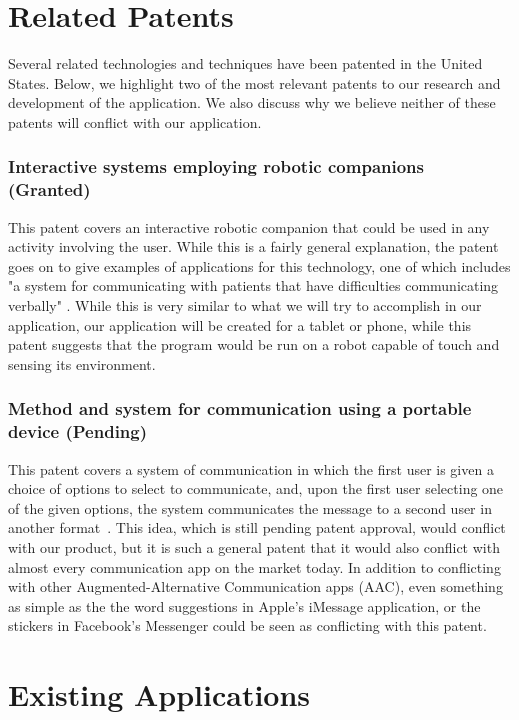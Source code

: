 \section{Related Patents}
Several related technologies and techniques have been patented in the United States. Below, we highlight two of the most relevant patents to our research and development of the application. We also discuss why we believe neither of these patents will conflict with our application.

\subsubsection{Interactive systems employing robotic companions (Granted)}
This patent covers an interactive robotic companion that could be used in any activity involving the user. While this is a fairly general explanation, the patent goes on to give examples of applications for this technology, one of which includes "a system for communicating with patients that have difficulties communicating verbally" \cite{stiehl}. While this is very similar to what we will try to accomplish in our application, our application will be created for a tablet or phone, while this patent suggests that the program would be run on a robot capable of touch and sensing its environment.

\subsubsection{Method and system for communication using a portable device (Pending)}
This patent covers a system of communication in which the first user is given a choice of options to select to communicate, and, upon the first user selecting one of the given options, the system communicates the message to a second user in another format~\cite{rashdan}. This idea, which is still pending patent approval, would conflict with our product, but it is such a general patent that it would also conflict with almost every communication app on the market today. In addition to conflicting with other Augmented-Alternative Communication apps (AAC), even something as simple as the the word suggestions in Apple's iMessage application, or the stickers in Facebook's Messenger could be seen as conflicting with this patent.

\section{Existing Applications}

